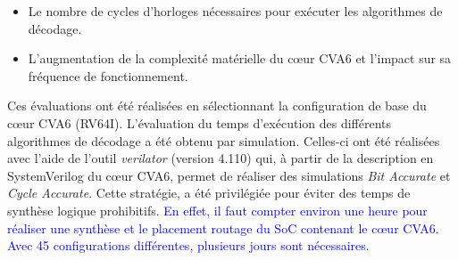 \documentclass[../main.tex]{subfiles}
\begin{document}
\begin{itemize}
    \item Le nombre de cycles d'horloges nécessaires pour exécuter les algorithmes de décodage.
    \item L'augmentation de la complexité matérielle du cœur CVA6 et l'impact sur sa fréquence de fonctionnement.
\end{itemize}

Ces évaluations ont été réalisées en sélectionnant la configuration de base du cœur CVA6 (RV64I).
L'évaluation du temps d'exécution des différents algorithmes de décodage a été obtenu par simulation. 
Celles-ci ont été réalisées avec l'aide de l'outil \textit{verilator} (version 4.110) qui, à partir de la description en SystemVerilog du cœur CVA6, permet de réaliser des simulations \textit{Bit Accurate} et \textit{Cycle Accurate}.
Cette stratégie, a été privilégiée pour éviter des temps de synthèse logique prohibitifs. 
\textcolor{blue}{En effet, il faut compter environ une heure pour réaliser une synthèse et le placement routage du SoC contenant le cœur CVA6. Avec 45 configurations différentes, plusieurs jours sont nécessaires.}
%
%
%
% 
% 
% 
\end{document}

